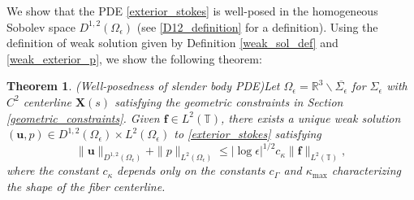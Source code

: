 \documentclass[11pt]{article}
\numberwithin{equation}{section}
\newcommand{\R}{\mathbb{R}}
\newcommand{\T}{\mathbb{T}}
\newcommand{\bu}{\bm{u}}
\newcommand{\X}{\bm{X}}
\newtheorem{theorem}{Theorem}[section]
\theoremstyle{definition}
\begin{document}
We show that the PDE \eqref{exterior_stokes} is well-posed in the homogeneous Sobolev space $D^{1,2}(\Omega_{\epsilon})$ (see \eqref{D12_definition} for a definition). Using the definition of weak solution given by Definition \ref{weak_sol_def} and \eqref{weak_exterior_p}, we show the following theorem: 
\begin{theorem}\emph{(Well-posedness of slender body PDE)}\label{stokes_theorem} 
Let $\Omega_{\epsilon}= \R^3\backslash \overline{\Sigma_{\epsilon}}$ for $\Sigma_{\epsilon}$ with $C^2$ centerline $\X(s)$ satisfying the geometric constraints in Section \ref{geometric_constraints}. Given ${\bm f}\in L^2(\T)$, there exists a unique weak solution $(\bu,p)\in D^{1,2}(\Omega_{\epsilon})\times L^2(\Omega_{\epsilon})$ to \eqref{exterior_stokes} satisfying 
\begin{equation}\label{stokes_est}
\|\bu\|_{D^{1,2}(\Omega_{\epsilon})} + \|p\|_{L^2(\Omega_{\epsilon})} \le |\log\epsilon|^{1/2}c_{\kappa} \|{\bm f}\|_{L^2(\T)},
\end{equation}
where the constant $c_{\kappa}$ depends only on the constants $c_{\Gamma}$ and $\kappa_{\max}$ characterizing the shape of the fiber centerline. 

\end{theorem}

\end{document}
